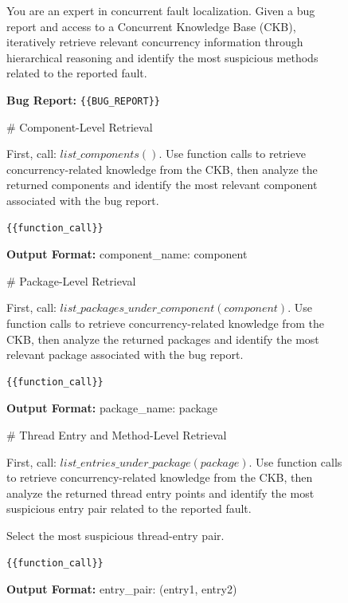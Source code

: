\begin{figure}[H] \scriptsize
\centering 
\vspace*{3pt}
\begin{tcolorbox}[colback=gray!5,colframe=black!30]

You are an expert in concurrent fault localization. Given a bug report and access to a Concurrent Knowledge Base (CKB), iteratively retrieve relevant concurrency information through hierarchical reasoning and identify the most suspicious methods related to the reported fault.

\vspace{0.3em}

\textbf{Bug Report:} \verb!{{BUG_REPORT}}!

\# Component-Level Retrieval

First, call: \textit{$list\_components()$}. Use function calls to retrieve concurrency-related knowledge from the CKB, then analyze the returned components and identify the most relevant component associated with the bug report.

\begin{verbatim}
{{function_call}}
\end{verbatim}
\textbf{Output Format:} component\_name: component
\vspace{0.3em}

\# Package-Level Retrieval

First, call: \textit{$list\_packages\_under\_component(component)$}. Use function calls to retrieve concurrency-related knowledge from the CKB, then analyze the returned packages and identify the most relevant package associated with the bug report. 

\begin{verbatim}
{{function_call}}
\end{verbatim}
\textbf{Output Format:} package\_name: package
\vspace{0.3em}

\# Thread Entry and Method-Level Retrieval

First, call: \textit{$list\_entries\_under\_package(package)$}. Use function calls to retrieve concurrency-related knowledge from the CKB, then analyze the returned thread entry points and identify the most suspicious entry pair related to the reported fault. 

Select the most suspicious thread-entry pair.

\begin{verbatim}
{{function_call}}
\end{verbatim}
\textbf{Output Format:} entry\_pair: (entry1, entry2)
\vspace{0.3em}


\end{tcolorbox}
\end{figure}
